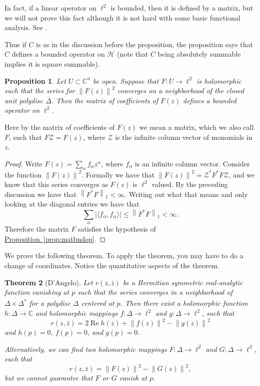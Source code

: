 \documentclass[12pt,openany]{book}
\renewcommand{\Re}{\operatorname{Re}}
\newcommand{\abs}[1]{\left\lvert {#1} \right\rvert}
\newcommand{\norm}[1]{\left\lVert {#1} \right\rVert}
\newcommand{\C}{{\mathbb{C}}}
\newcommand{\sH}{{\mathcal{H}}}
\newcommand{\sZ}{{\mathcal{Z}}}
\theoremstyle{plain}
\newtheorem{thm}{Theorem}[section]
\newtheorem{prop}[thm]{Proposition}
\theoremstyle{remark}
\theoremstyle{definition}
\theoremstyle{exercise}
\theoremstyle{example}
\newcommand{\propref}[1]{\hyperref[#1]{Proposition~\ref*{#1}}}
\begin{document}
In fact, if a linear operator on $\ell^2$ is bounded, then it is defined by a
matrix, but we will not prove this fact although it is not hard with some
basic functional analysis.  See \cite{AG:linop}.

Thus if $C$ is as in the discussion before the proposition, the proposition
says that $C$ defines a bounded operator on $\sH$ (note that $C$ being
absolutely summable implies it is square summable).

\begin{prop}
Let $U \subset \C^n$ be open.
Suppose that $F \colon U \to \ell^2$ is holomorphic such that
the series for $\norm{F(z)}^2$ converges on a neighborhood of
the closed unit polydisc $\overline{\Delta}$.  Then the matrix of coefficients of $F(z)$
defines a bounded operator on $\ell^2$.
\end{prop}

Here by the matrix of coefficients of $F(z)$ we mean a matrix,
which we also call $F$,
such that $F \sZ = F(z)$, where $\sZ$ is the infinite column vector
of monomials in $z$.

\begin{proof}
Write $F(z) = \sum_\alpha f_\alpha z^\alpha$, where $f_\alpha$ is an infinite
column vector.  Consider the function
$\norm{F(z)}^2$.  Formally we have that
$\norm{F(z)}^2 = \sZ^* F^*F \sZ$, and we know that this series converges as
$F(z)$ is $\ell^2$ valued.
By the preceding discussion we have that $\norm{F^*F}_1 <
\infty$.  Writing out what that means and only looking at the diagonal
entries we have that
\begin{equation}
\sum_\alpha \abs{\langle f_\alpha, f_\alpha \rangle} \leq \norm{F^*F}_1 < \infty
.
\end{equation}
Therefore the matrix $F$ satisfies the hypothesis of \propref{prop:matbndop}.
\end{proof}

We prove the following theorem.
To apply the theorem, you may have to do a
change of coordinates.  Notice the quantitative aspects of the theorem.

\begin{thm}[D'Angelo]
Let $r(z,\bar{z})$ be a Hermitian symmetric real-analytic function 
vanishing at $p$
such that the series converges in a neighborhood of $\overline{\Delta \times
\Delta^*}$ for a polydisc $\Delta$ centered at $p$.
Then there exist
a holomorphic
function $h \colon \Delta \to \C$ and holomorphic mappings
$f \colon \Delta \to \ell^2$ and
$g \colon \Delta \to \ell^2$, such that
\begin{equation}
r(z,\bar{z}) = 2 \Re h(z) + \norm{f(z)}^2 - \norm{g(z)}^2
\end{equation}
and $h(p) = 0$, $f(p) = 0$, and $g(p) = 0$.

Alternatively, we can find two holomorphic mappings
$F \colon \Delta \to \ell^2$ and
$G \colon \Delta \to \ell^2$, such that
\begin{equation}
r(z,\bar{z}) = \norm{F(z)}^2 - \norm{G(z)}^2 ,
\end{equation}
but we cannot guarantee that $F$ or $G$ vanish at $p$.
\end{thm}
\end{document}
